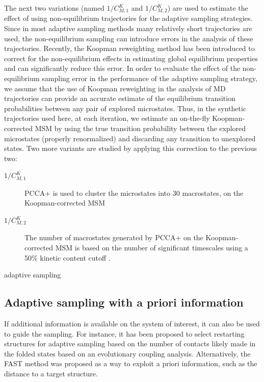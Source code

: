 The next two variations (named $1/C_{M,1}^K$ and $1/C_{M,2}^K$) are used to
estimate the effect of using non-equilibrium trajectories for the adaptive sampling
strategies. Since in most adaptive sampling methods many relatively short
trajectories are used, the non-equilibrium sampling can introduce errors in the
analysis of these trajectories.
Recently, the Koopman reweighting method
\cite{koopmanold, koopman2,koopman3,koopman4, wu2017variational, Nueske2017} has been
introduced to correct for the non-equilibrium effects in estimating global
equilibrium properties and can significantly reduce this error. In order to
evaluate the effect of the non-equilibrium sampling error in the performance of
the adaptive sampling strategy, we assume that the use of Koopman reweighting
in the analysis of MD trajectories can provide an accurate estimate of the
equilibrium transition probabilities between any pair of explored microstates.
Thus, in the synthetic trajectories used here, at each iteration, we estimate
an on-the-fly Koopman-corrected MSM by using the true transition probability
between the explored microstates (properly renormalized) and discarding any
transition to unexplored states.  Two more variants are studied by applying this correction to the previous two: 
\begin{description}
\item[$1/C_{M,1}^K$]
PCCA+ is used to cluster the microstates into 30 macrostates, on the Koopman-corrected MSM
\item[$1/C_{M,2}^K$]
The number of macrostates generated by PCCA+ on the Koopman-corrected MSM is
based on the number of significant timescales using a 50\% kinetic content
cutoff \cite{noe2016commute}.
\end{description}

adaptive sampling

\subsection{Adaptive sampling with a priori information}
If additional information is available on the system of interest, it can also be used to
guide the sampling. For instance, it has been proposed
\cite{EvolutionCoupling-Shamsi2017} to select restarting structures for
adaptive sampling based on the number of contacts likely made in the folded
states based on an evolutionary coupling analysis. Alternatively, the FAST
method \cite{FAST-Bowman-2015} was proposed as a way to exploit a priori
information, such as the distance to a target structure. 

